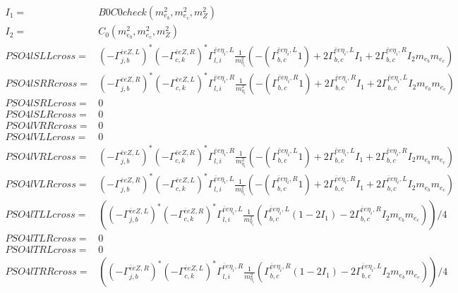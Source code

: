 \documentclass[A4,landscape]{article}
\begin{document}
\begin{align} 
I_1= & B0C0check(m^2_{e_{{b}}}, m^2_{e_{{c}}}, m^2_{Z}) \\ 
I_2= & C_0(m^2_{e_{{b}}}, m^2_{e_{{c}}}, m^2_{Z}) \\ 
  PSO4lSLLcross= &  (- \Gamma^{\bar{e}e Z ,L} _{j, b})^* (- \Gamma^{\bar{e}e Z ,R} _{c, k})^* \Gamma^{\bar{e}e \eta_i ,L}_{l, i} \frac{1}{m^2_{\eta_i}} (-(\Gamma^{\bar{e}e \eta_i ,L}_{b, c} 1) + 2 \Gamma^{\bar{e}e \eta_i ,L}_{b, c} I_1 + 2 \Gamma^{\bar{e}e \eta_i ,R}_{b, c} I_2 m_{e_{{b}}} m_{e_{{c}}}) \\ 
  PSO4lSRRcross= &  (- \Gamma^{\bar{e}e Z ,R} _{j, b})^* (- \Gamma^{\bar{e}e Z ,L} _{c, k})^* \Gamma^{\bar{e}e \eta_i ,R}_{l, i} \frac{1}{m^2_{\eta_i}} (-(\Gamma^{\bar{e}e \eta_i ,R}_{b, c} 1) + 2 \Gamma^{\bar{e}e \eta_i ,R}_{b, c} I_1 + 2 \Gamma^{\bar{e}e \eta_i ,L}_{b, c} I_2 m_{e_{{b}}} m_{e_{{c}}}) \\ 
  PSO4lSRLcross= & 0 \\ 
  PSO4lSLRcross= & 0 \\ 
  PSO4lVRRcross= & 0 \\ 
  PSO4lVLLcross= & 0 \\ 
  PSO4lVRLcross= &  (- \Gamma^{\bar{e}e Z ,L} _{j, b})^* (- \Gamma^{\bar{e}e Z ,R} _{c, k})^* \Gamma^{\bar{e}e \eta_i ,R}_{l, i} \frac{1}{m^2_{\eta_i}} (-(\Gamma^{\bar{e}e \eta_i ,L}_{b, c} 1) + 2 \Gamma^{\bar{e}e \eta_i ,L}_{b, c} I_1 + 2 \Gamma^{\bar{e}e \eta_i ,R}_{b, c} I_2 m_{e_{{b}}} m_{e_{{c}}}) \\ 
  PSO4lVLRcross= &  (- \Gamma^{\bar{e}e Z ,R} _{j, b})^* (- \Gamma^{\bar{e}e Z ,L} _{c, k})^* \Gamma^{\bar{e}e \eta_i ,L}_{l, i} \frac{1}{m^2_{\eta_i}} (-(\Gamma^{\bar{e}e \eta_i ,R}_{b, c} 1) + 2 \Gamma^{\bar{e}e \eta_i ,R}_{b, c} I_1 + 2 \Gamma^{\bar{e}e \eta_i ,L}_{b, c} I_2 m_{e_{{b}}} m_{e_{{c}}}) \\ 
  PSO4lTLLcross= & ( (- \Gamma^{\bar{e}e Z ,L} _{j, b})^* (- \Gamma^{\bar{e}e Z ,R} _{c, k})^* \Gamma^{\bar{e}e \eta_i ,L}_{l, i} \frac{1}{m^2_{\eta_i}} (\Gamma^{\bar{e}e \eta_i ,L}_{b, c} (1 - 2 I_1) - 2 \Gamma^{\bar{e}e \eta_i ,R}_{b, c} I_2 m_{e_{{b}}} m_{e_{{c}}}))/4 \\ 
  PSO4lTLRcross= & 0 \\ 
  PSO4lTRLcross= & 0 \\ 
  PSO4lTRRcross= & ( (- \Gamma^{\bar{e}e Z ,R} _{j, b})^* (- \Gamma^{\bar{e}e Z ,L} _{c, k})^* \Gamma^{\bar{e}e \eta_i ,R}_{l, i} \frac{1}{m^2_{\eta_i}} (\Gamma^{\bar{e}e \eta_i ,R}_{b, c} (1 - 2 I_1) - 2 \Gamma^{\bar{e}e \eta_i ,L}_{b, c} I_2 m_{e_{{b}}} m_{e_{{c}}}))/4 \\ 
\end{align} 
\end{document}
